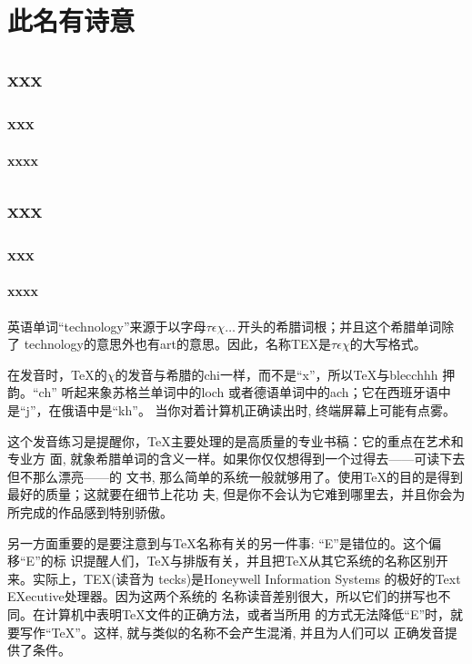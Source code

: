 
\chapter{此名有诗意}
\section{xxx}
\subsection{xxx}
\subsubsection{xxxx}
\section{xxx}
\subsection{xxx}
\subsubsection{xxxx}
英语单词“technology”来源于以字母$\tau\epsilon\chi\ldots\,$开头的希腊词根；并且这个希腊单词除了
technology的意思外也有art的意思。因此，名称TEX是$\tau\epsilon\chi$的大写格式。

在发音时，\TeX 的$\chi$的发音与希腊的chi一样，而不是“x”，所以\TeX 与blecchhh 押韵。“ch”
听起来象苏格兰单词中的loch 或者德语单词中的ach；它在西班牙语中是“j”，在俄语中是“kh”。
当你对着计算机正确读出时, 终端屏幕上可能有点雾。

这个发音练习是提醒你，\TeX 主要处理的是高质量的专业书稿：它的重点在艺术和专业方
面, 就象希腊单词的含义一样。如果你仅仅想得到一个过得去——可读下去但不那么漂亮——的
文书, 那么简单的系统一般就够用了。使用\TeX 的目的是得到最好的质量；这就要在细节上花功
夫, 但是你不会认为它难到哪里去，并且你会为所完成的作品感到特别骄傲。

另一方面重要的是要注意到与\TeX 名称有关的另一件事: “E”是错位的。这个偏移“E”的标
识提醒人们，\TeX 与排版有关，并且把\TeX 从其它系统的名称区别开来。实际上，TEX(读音为
tecks)是Honeywell Information Systems 的极好的Text EXecutive处理器。因为这两个系统的
名称读音差别很大，所以它们的拼写也不同。在计算机中表明\TeX 文件的正确方法，或者当所用
的方式无法降低“E”时，就要写作“TeX”。这样, 就与类似的名称不会产生混淆, 并且为人们可以
正确发音提供了条件。